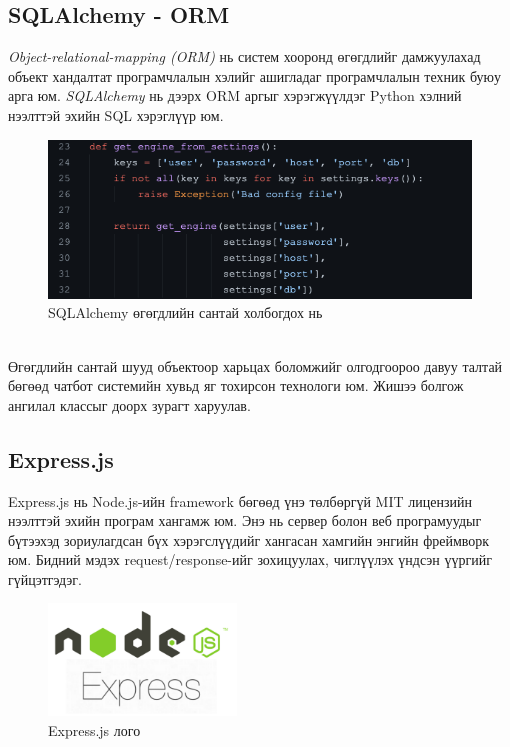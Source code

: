 \subsection{SQLAlchemy - ORM}
\textit{Object-relational-mapping (ORM)} нь систем хооронд өгөгдлийг дамжуулахад объект хандалтат програмчлалын хэлийг ашигладаг програмчлалын техник буюу арга юм. \textit{SQLAlchemy} нь дээрх ORM аргыг хэрэгжүүлдэг Python хэлний нээлттэй эхийн SQL хэрэглүүр юм. 
\begin{figure}[ht]
  \centering
  \includegraphics[height=5  cm]{images/connection.png}
  \caption{SQLAlchemy өгөгдлийн сантай холбогдох нь} \label{fig:connection}
\end{figure}
\\Өгөгдлийн сантай шууд объектоор харьцах боломжийг олгодгоороо давуу талтай бөгөөд чатбот системийн хувьд яг тохирсон технологи юм. Жишээ болгож ангилал классыг доорх зурагт харуулав.
 
\subsection{Express.js}
Express.js нь Node.js-ийн framework бөгөөд үнэ төлбөргүй MIT лицензийн нээлттэй эхийн програм хангамж юм. Энэ нь сервер болон веб програмуудыг бүтээхэд зориулагдсан бүх хэрэгслүүдийг хангасан хамгийн энгийн фреймворк юм. Бидний мэдэх request/response-ийг зохицуулах, чиглүүлэх үндсэн үүргийг гүйцэтгэдэг.
\begin{figure}[ht]
  \centering
  \includegraphics[width=5cm]{images/expressJs.png}
  \caption{Express.js лого} \label{fig:expressjs}
\end{figure}
